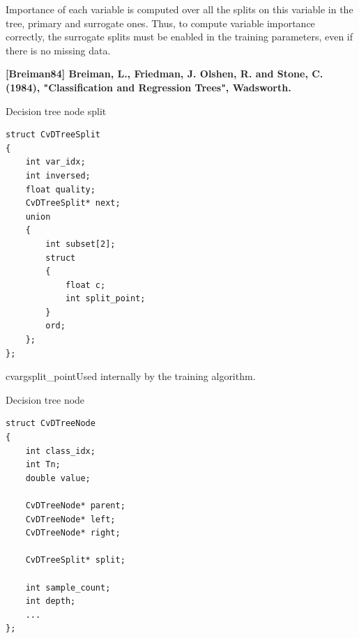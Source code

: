 Importance of each variable is computed over all the splits on this variable in the tree, primary and surrogate ones. Thus, to compute variable importance correctly, the surrogate splits must be enabled in the training parameters, even if there is no missing data.

\textbf{[Breiman84] Breiman, L., Friedman, J. Olshen, R. and Stone, C. (1984), "Classification and Regression Trees", Wadsworth.}



Decision tree node split

\begin{lstlisting}
struct CvDTreeSplit
{
    int var_idx;
    int inversed;
    float quality;
    CvDTreeSplit* next;
    union
    {
        int subset[2];
        struct
        {
            float c;
            int split_point;
        }
        ord;
    };
};
\end{lstlisting}

\begin{description}
cvarg{split\_point}{Used internally by the training algorithm.}
\end{description}



Decision tree node

\begin{lstlisting}
struct CvDTreeNode
{
    int class_idx;
    int Tn;
    double value;

    CvDTreeNode* parent;
    CvDTreeNode* left;
    CvDTreeNode* right;

    CvDTreeSplit* split;

    int sample_count;
    int depth;
    ...
};
\end{lstlisting}

